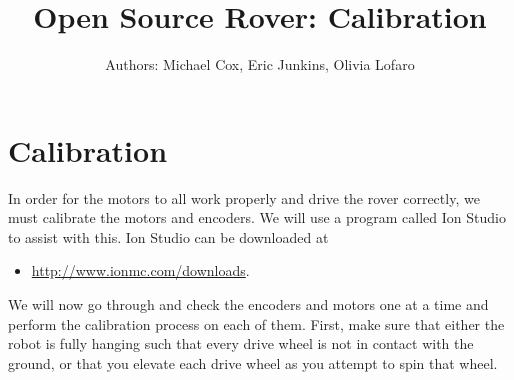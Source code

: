 \documentclass[12pt]{article}
\begin{document}
\title{Open Source Rover: Calibration}
\author{Authors: Michael Cox, Eric Junkins, Olivia Lofaro}

\makeatletter         
\def\@maketitle{
\begin{center}	
	\makebox[\textwidth][c]{ \texttt{[image: "Pictures/calibration".png]}}
	{\Huge \bfseries \sffamily \@title }\\[3ex] 
	{\Large \sffamily \@author}\\[3ex] 
	\texttt{[image: "Pictures/JPL logo".png]}
\end{center}}
\makeatother

\maketitle


\newpage


\tableofcontents




\section{Calibration}
\label{cal section}
In order for the motors to all work properly and drive the rover correctly, we must calibrate the motors and encoders. We will use a program called Ion Studio to assist with this. Ion Studio can be downloaded at 
\begin{itemize}
	\item \href{http://www.ionmc.com/downloads}{http://www.ionmc.com/downloads}. 
\end{itemize}

\noindent We will now go through and check the encoders and motors one at a time and perform the calibration process on each of them. First, make sure that either the robot is fully hanging such that every drive wheel is not in contact with the ground, or that you elevate each drive wheel as you attempt to spin that wheel.
\end{document}
